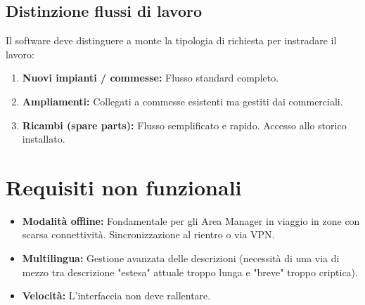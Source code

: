 \documentclass[12pt, a4paper]{article} %
\begin{document}
\subsection{Distinzione flussi di lavoro}
Il software deve distinguere a monte la tipologia di richiesta per instradare
il lavoro:
\begin{enumerate}
    \item \textbf{Nuovi impianti / commesse:} Flusso standard completo.
    \item \textbf{Ampliamenti:} Collegati a commesse esistenti ma gestiti dai commerciali.
    \item \textbf{Ricambi (spare parts):} Flusso semplificato e rapido. Accesso allo storico installato.
\end{enumerate}

\section{Requisiti non funzionali}
\begin{itemize}
    \item \textbf{Modalità offline:} Fondamentale per gli Area Manager in viaggio in zone con scarsa connettività. Sincronizzazione al rientro o via VPN.
    \item \textbf{Multilingua:} Gestione avanzata delle descrizioni (necessità di una via di mezzo tra descrizione "estesa" attuale troppo lunga e "breve" troppo criptica).
    \item \textbf{Velocità:} L'interfaccia non deve rallentare.
\end{itemize}
\end{document}
